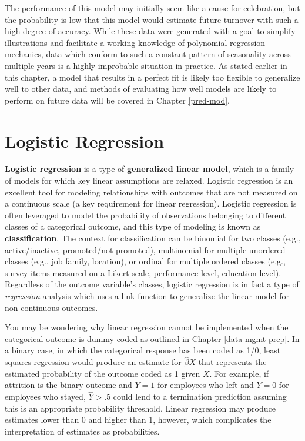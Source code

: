 \documentclass[
]{book}
\begin{document}
The performance of this model may initially seem like a cause for celebration, but the probability is low that this model would estimate future turnover with such a high degree of accuracy. While these data were generated with a goal to simplify illustrations and facilitate a working knowledge of polynomial regression mechanics, data which conform to such a constant pattern of seasonality across multiple years is a highly improbable situation in practice. As stated earlier in this chapter, a model that results in a perfect fit is likely too flexible to generalize well to other data, and methods of evaluating how well models are likely to perform on future data will be covered in Chapter \ref{pred-mod}.

\hypertarget{logistic-regression}{%
\section{Logistic Regression}\label{logistic-regression}}

\textbf{Logistic regression} is a type of \textbf{generalized linear model}, which is a family of models for which key linear assumptions are relaxed. Logistic regression is an excellent tool for modeling relationships with outcomes that are not measured on a continuous scale (a key requirement for linear regression). Logistic regression is often leveraged to model the probability of observations belonging to different classes of a categorical outcome, and this type of modeling is known as \textbf{classification}. The context for classification can be binomial for two classes (e.g., active/inactive, promoted/not promoted), multinomial for multiple unordered classes (e.g., job family, location), or ordinal for multiple ordered classes (e.g., survey items measured on a Likert scale, performance level, education level). Regardless of the outcome variable's classes, logistic regression is in fact a type of \emph{regression} analysis which uses a link function to generalize the linear model for non-continuous outcomes.

You may be wondering why linear regression cannot be implemented when the categorical outcome is dummy coded as outlined in Chapter \ref{data-mgmt-prep}. In a binary case, in which the categorical response has been coded as 1/0, least squares regression would produce an estimate for \(\hat\beta X\) that represents the estimated probability of the outcome coded as 1 given \(X\). For example, if attrition is the binary outcome and \(Y = 1\) for employees who left and \(Y = 0\) for employees who stayed, \(\hat Y > .5\) could lend to a termination prediction assuming this is an appropriate probability threshold. Linear regression may produce estimates lower than 0 and higher than 1, however, which complicates the interpretation of estimates as probabilities.
\end{document}
